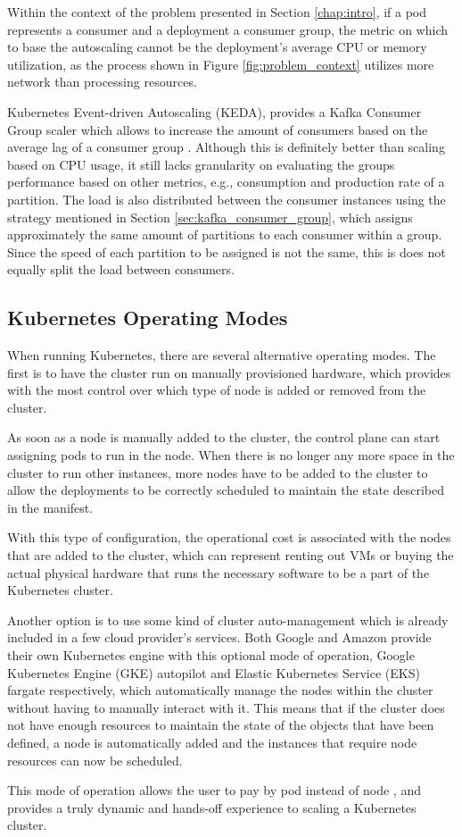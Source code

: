 Within the context of the problem presented in Section \ref{chap:intro}, if a
pod represents a consumer and a deployment a consumer group, the metric on
which to base the autoscaling cannot be the deployment's average CPU or memory
utilization, as the process shown in Figure \ref{fig:problem_context} utilizes
more network than processing resources. 

Kubernetes Event-driven Autoscaling (KEDA), provides a Kafka Consumer Group
scaler which allows to increase the amount of consumers based on the average lag
of a consumer group \cite{KEDA}. Although this is definitely better than scaling
based on CPU usage, it still lacks granularity on evaluating the groups
performance based on other metrics, e.g., consumption and production rate of a
partition. The load is also distributed between the consumer instances using the
strategy mentioned in Section \ref{sec:kafka_consumer_group}, which assigns
approximately the same amount of partitions to each consumer within a group.
Since the speed of each partition to be assigned is not the same, this is does
not equally split the load between consumers.

\subsection{Kubernetes Operating Modes}

When running Kubernetes, there are several alternative operating modes. The
first is to have the cluster run on manually provisioned hardware, which
provides with the most control over which type of node is added or removed from
the cluster. 

As soon as a node is manually added to the cluster, the control plane can start
assigning pods to run in the node. When there is no longer any more space in the
cluster to run other instances, more nodes have to be added to the cluster to
allow the deployments to be correctly scheduled to maintain the state described
in the manifest.

With this type of configuration, the operational cost is associated with the
nodes that are added to the cluster, which can represent renting out VMs or
buying the actual physical hardware that runs the necessary software to be a
part of the Kubernetes cluster.

Another option is to use some kind of cluster auto-management which is already
included in a few cloud provider's services. Both Google and Amazon provide
their own Kubernetes engine with this optional mode of operation, Google
Kubernetes Engine (GKE) autopilot and Elastic Kubernetes Service (EKS) fargate
respectively, which automatically manage the nodes within the cluster without
having to manually interact with it. This means that if the cluster does not
have enough resources to maintain the state of the objects that have been
defined, a node is automatically added and the instances that require node
resources can now be scheduled.

This mode of operation allows the user to pay by pod instead of node
\cite{GKEautopilot, EKSfargate}, and provides a truly dynamic and hands-off
experience to scaling a Kubernetes cluster.
